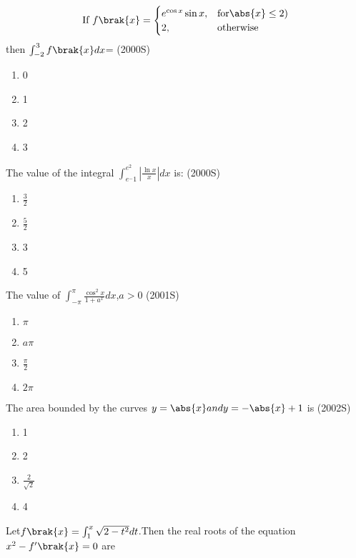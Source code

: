 \iffalse
\title{DEFINITE INTEGRALS}
\author{BHUKYA PRAJWAL NAIK}
\section{mains}
\fi

\item
\begin{equation}
	\text{If } f\brak{x} = 
\begin{cases}
	e^{\cos x}\sin x, & \text{for} \abs{x} \leq 2)\\
	2, & \text{otherwise}\\
\end{cases}
\end{equation}
then $\int_{-2}^{3}f\brak{x} dx$=
		\hfill(2000S)
\begin{enumerate}
    \item 0
    \item 1
    \item 2
    \item 3
\end{enumerate}
\item The value of the integral $\int_{e^-1}^{e^2}\left|\frac{\ln x}{x}\right| dx$ is:
	\hfill(2000S)
\begin{enumerate}
	\item $\frac{3}{2}$
	\item $\frac{5}{2}$
    \item  3
    \item  5
\end{enumerate}
\item The value of $\int_{-\pi}^{\pi}\frac{\cos^2 x}{1+a^ x } dx$,$a>0$
	\hfill(2001S)
\begin{enumerate}
    \item$\pi$
    \item $a\pi$
    \item $\frac{\pi}{2}$
    \item $2\pi$
\end{enumerate}
\item The area bounded by the curves $y=\abs{x} and y=-\abs{x}+1$ is
	\hfill(2002S)
\begin{enumerate}
 \item  1
 \item  2
 \item  $\frac{2}{\sqrt{2}}$
 \item  4
\end{enumerate}
\item Let$f\brak{x}=\int_{1}^{x}\sqrt{2-{t}^2} dt $.Then the real roots of the equation ${x}^2-f'\brak{x}=0$ are 

